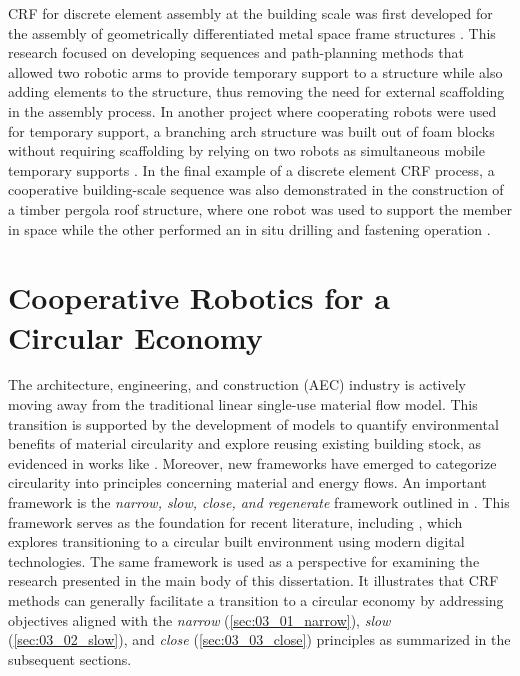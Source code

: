     CRF for discrete element assembly at the building scale was first developed for the assembly of geometrically differentiated metal space frame structures \citep{parascho_cooperative_2017,parascho_computational_2018}. This research focused on developing sequences and path-planning methods that allowed two robotic arms to provide temporary support to a structure while also adding elements to the structure, thus removing the need for external scaffolding in the assembly process. In another project where cooperating robots were used for temporary support, a branching arch structure was built out of foam blocks without requiring scaffolding by relying on two robots as simultaneous mobile temporary supports \citep{wu_robotic_2018}. In the final example of a discrete element CRF process, a cooperative building-scale sequence was also demonstrated in the construction of a timber pergola roof structure, where one robot was used to support the member in space while the other performed an in situ drilling and fastening operation \citep{thoma_cooperative_2019}.


\section{Cooperative Robotics for a Circular Economy}\label{sec:03_crf_ce}

    The architecture, engineering, and construction (AEC) industry is actively moving away from the traditional linear single-use material flow model. This transition is supported by the development of models to quantify environmental benefits of material circularity and explore reusing existing building stock, as evidenced in works like \cite{cottafava_circularity_2021, eberhardt_circular_2021}. Moreover, new frameworks have emerged to categorize circularity into principles concerning material and energy flows. An important framework is the \textit{narrow, slow, close, and regenerate} framework outlined in \cite{konietzko_circular_2020, cetin_circular_2021}. This framework serves as the foundation for recent literature, including \citep{de_wolf_circular_2023}, which explores transitioning to a circular built environment using modern digital technologies. The same framework is used as a perspective for examining the research presented in the main body of this dissertation. It illustrates that CRF methods can generally facilitate a transition to a circular economy by addressing objectives aligned with the \textit{narrow} (\cref{sec:03_01_narrow}), \textit{slow} (\cref{sec:03_02_slow}), and \textit{close} (\cref{sec:03_03_close}) principles as summarized in the subsequent sections.
        
